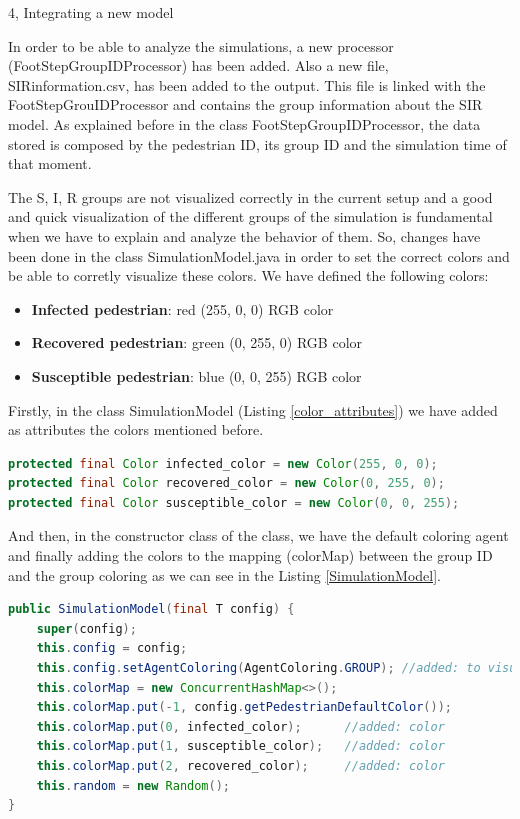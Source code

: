\documentclass[10pt,a4paper]{article}
\begin{document}
\begin{task}{4, Integrating a new model}
\begin{itemize}
\end{itemize}


In order to be able to analyze the simulations, a new processor (FootStepGroupIDProcessor) has been added. Also a new file, SIRinformation.csv, has been added to the output. This file is linked with the FootStepGrouIDProcessor and contains the group information about the SIR model. As explained before in the class FootStepGroupIDProcessor, the data stored is composed by the pedestrian ID, its group ID and the simulation time of that moment. 

\bigskip


The S, I, R groups are not visualized correctly in the current setup and a good and quick visualization of the different groups of the simulation is fundamental when we have to explain and analyze the behavior of them. So, changes have been done in the class SimulationModel.java in order to set the correct colors and be able to corretly visualize these colors. We have defined the following colors:
    \begin{itemize}
        \item \textbf{Infected pedestrian}: red (255, 0, 0) RGB color
        \item \textbf{Recovered pedestrian}: green (0, 255, 0) RGB color
        \item \textbf{Susceptible pedestrian}: blue (0, 0, 255) RGB color
    \end{itemize}

Firstly, in the class SimulationModel (Listing \ref{color_attributes}) we have added as attributes the colors mentioned before.
\begin{lstlisting}[language = Java, caption = new attributes of the SimulationModel class, label={color_attributes}]
protected final Color infected_color = new Color(255, 0, 0); 
protected final Color recovered_color = new Color(0, 255, 0);
protected final Color susceptible_color = new Color(0, 0, 255);
\end{lstlisting}

And then, in the constructor class of the class, we have the default coloring agent and finally adding the colors to the mapping (colorMap) between the group ID and the group coloring as we can see in the Listing \ref{SimulationModel}.
\begin{lstlisting}[language = Java, caption = constructor of the SimulationModel class, label={SimulationModel}]
public SimulationModel(final T config) {
	super(config);
	this.config = config;
	this.config.setAgentColoring(AgentColoring.GROUP); //added: to visualize corretly the group colors
	this.colorMap = new ConcurrentHashMap<>();
	this.colorMap.put(-1, config.getPedestrianDefaultColor());
	this.colorMap.put(0, infected_color);      //added: color
	this.colorMap.put(1, susceptible_color);   //added: color
	this.colorMap.put(2, recovered_color);     //added: color
	this.random = new Random();
}
\end{lstlisting}


\end{task}
\end{document}
